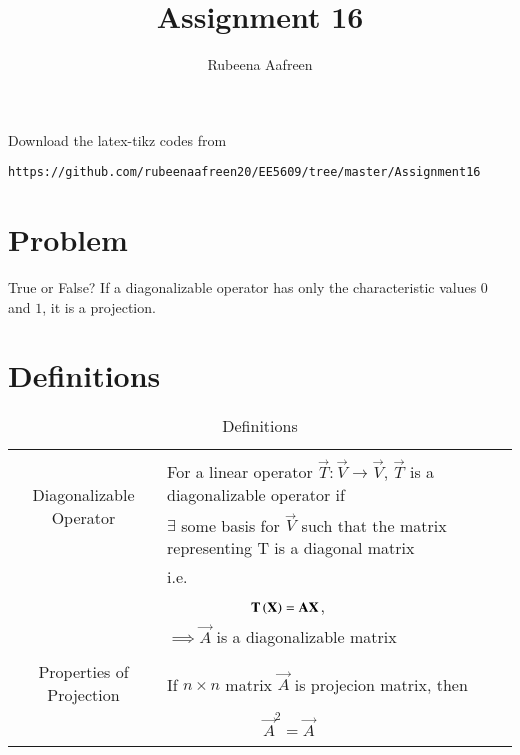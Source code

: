 \documentclass[journal,12pt]{IEEEtran}
\begin{document}
     \def\rightbox#1{\makebox[0in][r]{#1}}
     \def\centbox#1{\makebox[0in]{#1}}
     \def\topbox#1{\raisebox{-\baselineskip}[0in][0in]{#1}}
     \def\midbox#1{\raisebox{-0.5\baselineskip}[0in][0in]{#1}}
\vspace{3cm}
\title{Assignment 16}
\author{Rubeena Aafreen}
\maketitle
\bigskip
\renewcommand{\thefigure}{\theenumi}
\renewcommand{\thetable}{\theenumi}
%
Download the latex-tikz codes from 
%
\begin{lstlisting}
https://github.com/rubeenaafreen20/EE5609/tree/master/Assignment16
\end{lstlisting}
\section{\textbf{Problem}}
%
True or False? If a diagonalizable operator has only the characteristic values $0$ and $1$, it is a projection.
\section{\textbf{Definitions}}
\renewcommand{\thetable}{1}
\begin{table}[ht!]
\centering
\begin{tabular}{|c|l|}
    \hline
    \multirow{3}{*}{Diagonalizable Operator} 
	& \\
	& For a linear operator $\vec{T}\colon \vec{V}\longrightarrow \vec{V}$, $\vec{T}$ is a diagonalizable operator if \\
	& $\exists$ some basis for $\Vec{V}$ such that the matrix representing T is a diagonal matrix\\
	&i.e.\\
	& $\qquad\qquad\qquad \vec{T}\brak{\vec{X}}=\Vec{A}\Vec{X}$,\\
    &$\implies \vec{A}$ is a diagonalizable matrix\\
	&\\
	\hline
	\multirow{3}{*}{Properties of Projection} 
	& \\
	& If $n\times n$ matrix $\vec{A}$ is projecion matrix, then\\
	&\\
	&$\qquad\qquad\qquad \vec{A}^2=\vec{A}$\\
	&\\
	\hline
\end{tabular}
\label{table:1}
    \caption{Definitions}
\end{table}
\newpage
\end{document}
